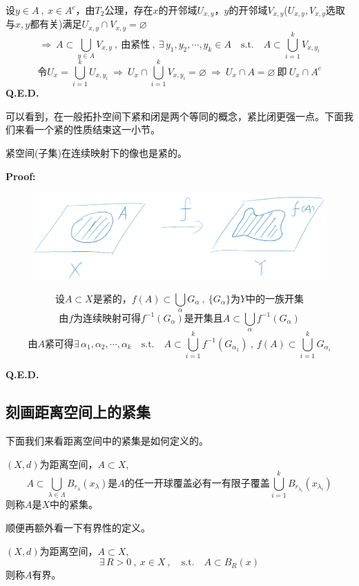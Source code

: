 设$y \in A \ , \ x \in A^c$，由$T_2$公理，存在$x$的开邻域$U_{x,y}$，$y$的开邻域$V_{x,y}$($U_{x,y},V_{x,y}$选取与$x,y$都有关)满足$U_{x,y} \cap V_{x,y}=\varnothing$
\[\Rightarrow \ A \subset \bigcup_{y \in A}V_{x,y} \ , \ \text{由紧性} \ , \ \exists \, y_1,y_2,\cdots,y_k \in A \quad \text{s.t.} \quad A \subset \bigcup_{i=1}^kV_{x,y_i}\]
\[\text{令}U_x=\bigcup_{i=1}^kU_{x,y_i} \ \Rightarrow \ U_x \cap \bigcup_{i=1}^kV_{x,y_i}=\varnothing \ \Rightarrow \ U_x \cap A=\varnothing \ \text{即} \ U_x \cap A^c\]
\textbf{Q.E.D.}

可以看到，在一般拓扑空间下紧和闭是两个等同的概念，紧比闭更强一点。下面我们来看一个紧的性质结束这一小节。
\begin{theorem}
    紧空间(子集)在连续映射下的像也是紧的。
\end{theorem}
\textbf{Proof:}
\begin{figure}[htbp]
    \center
    \includegraphics[scale=0.2]{./fig/2.2.2-1.png}
\end{figure}
\[\text{设}A \subset X\text{是紧的，}f(A) \subset \bigcup_\alpha G_\alpha \ , \ \{G_{\alpha}\}\text{为}Y\text{中的一族开集}\]
\[\text{由$f$为连续映射可得}f^{-1}(G_{\alpha})\text{是开集且}A \subset \bigcup_{\alpha}f^{-1}(G_{\alpha})\]
\[\text{由$A$紧可得} \exists \, \alpha_1,\alpha_2,\cdots,\alpha_k \quad \text{s.t.} \quad A \subset \bigcup_{i=1}^kf^{-1}(G_{\alpha_1}) \ , \ f(A) \subset \bigcup_{i=1}^kG_{\alpha_i}\]

\textbf{Q.E.D.}

\subsection{刻画距离空间上的紧集} \label{compact}
下面我们来看距离空间中的紧集是如何定义的。
\begin{definition}[距离空间中的紧集]
    $(X,d)$为距离空间，$A \subset X$,
    \[A \subset \bigcup_{\lambda \in \Lambda}B_{r_{\lambda}}(x_{\lambda})\text{是$A$的任一开球覆盖必有一有限子覆盖}\bigcup_{i=1}^kB_{r_{\lambda_i}}(x_{\lambda_i})\]
    则称$A$是$X$中的紧集。
\end{definition}
顺便再额外看一下有界性的定义。
\begin{definition}[距离空间中的有界性]
    $(X,d)$为距离空间，$A \subset X$,
    \[\exists \, R>0 \ , \ x \in X \ , \quad \text{s.t.} \quad A \subset B_R(x)\]
    则称$A$有界。
\end{definition}
